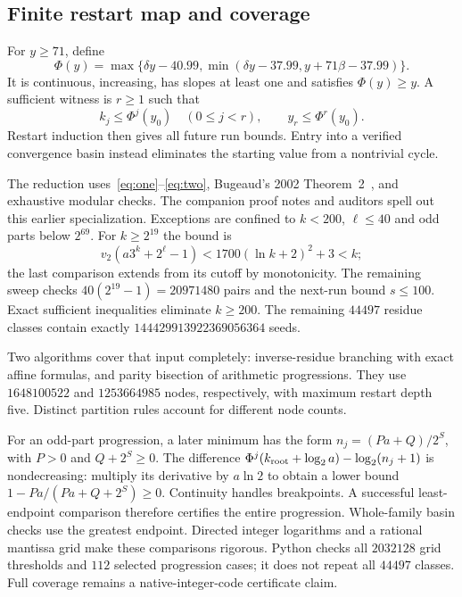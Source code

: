 \documentclass[11pt]{article}
\theoremstyle{definition}\newtheorem{definition}[theorem]{Definition}
\newcommand{\lb}{\log_2}
\newcommand{\val}{v_2}
\begin{document}
\subsection{Finite restart map and coverage}
For $y\ge71$, define
\[
 \Phi(y)=\max\{\delta y-40.99,
             \min(\delta y-37.99,y+71\beta-37.99)\}.
\]
It is continuous, increasing, has slopes at least one and satisfies $\Phi(y)\ge y$. A sufficient witness is $r\ge1$ such that
\[
 k_j\le\Phi^j(y_0)\quad(0\le j<r),\qquad y_r\le\Phi^r(y_0).
\]
Restart induction then gives all future run bounds. Entry into a verified convergence basin instead eliminates the starting value from a nontrivial cycle.

The reduction uses~\eqref{eq:one}--\eqref{eq:two}, Bugeaud's 2002 Theorem~2~\cite{bugeaud02}, and exhaustive modular checks. The companion proof notes and auditors spell out this earlier specialization. Exceptions are confined to $k<200$, $\ell\le40$ and odd parts below $2^{69}$. For $k\ge2^{19}$ the bound is
\[
 \val(a3^k+2^\ell-1)<1700(\ln k+2)^2+3<k;
\]
the last comparison extends from its cutoff by monotonicity. The remaining sweep checks $40(2^{19}-1)=20971480$ pairs and the next-run bound $s\le100$. Exact sufficient inequalities eliminate $k\ge200$. The remaining $44497$ residue classes contain exactly $144429913922369056364$ seeds.

Two algorithms cover that input completely: inverse-residue branching with exact affine formulas, and parity bisection of arithmetic progressions. They use $1648100522$ and $1253664985$ nodes, respectively, with maximum restart depth five. Distinct partition rules account for different node counts.

For an odd-part progression, a later minimum has the form $n_j=(Pa+Q)/2^S$, with $P>0$ and $Q+2^S\ge0$. The difference
$\Phi^j(k_{\rm root}+\lb a)-\lb(n_j+1)$ is nondecreasing: multiply its derivative by $a\ln2$ to obtain a lower bound $1-Pa/(Pa+Q+2^S)\ge0$. Continuity handles breakpoints. A successful least-endpoint comparison therefore certifies the entire progression. Whole-family basin checks use the greatest endpoint. Directed integer logarithms and a rational mantissa grid make these comparisons rigorous. Python checks all $2032128$ grid thresholds and $112$ selected progression cases; it does not repeat all $44497$ classes. Full coverage remains a native-integer-code certificate claim.
\end{document}
